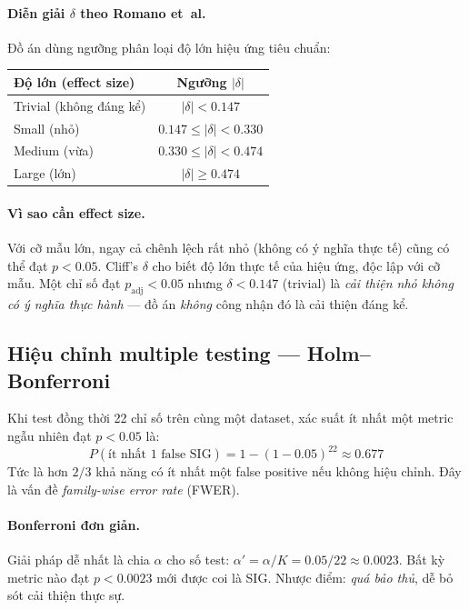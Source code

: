 \paragraph{Diễn giải $\delta$ theo Romano et~al.}
Đồ án dùng ngưỡng phân loại độ lớn hiệu ứng tiêu chuẩn:
\begin{center}
\begin{tabular}{lc}
\toprule
\textbf{Độ lớn (effect size)} & \textbf{Ngưỡng $|\delta|$} \\
\midrule
Trivial (không đáng kể)   & $|\delta| < 0.147$ \\
Small (nhỏ)               & $0.147 \le |\delta| < 0.330$ \\
Medium (vừa)              & $0.330 \le |\delta| < 0.474$ \\
Large (lớn)               & $|\delta| \ge 0.474$ \\
\bottomrule
\end{tabular}
\end{center}

\paragraph{Vì sao cần effect size.}
Với cỡ mẫu lớn, ngay cả chênh lệch rất nhỏ (không có ý nghĩa thực tế) cũng có thể đạt $p < 0.05$. Cliff's $\delta$ cho biết độ lớn thực tế của hiệu ứng, độc lập với cỡ mẫu. Một chỉ số đạt $p_{\mathrm{adj}} < 0.05$ nhưng $\delta < 0.147$ (trivial) là \emph{cải thiện nhỏ không có ý nghĩa thực hành} --- đồ án \emph{không} công nhận đó là cải thiện đáng kể.

\subsection{Hiệu chỉnh multiple testing --- Holm--Bonferroni}
\label{ssec:holm}

Khi test đồng thời 22 chỉ số trên cùng một dataset, xác suất ít nhất một metric ngẫu nhiên đạt $p < 0.05$ là:
\begin{equation}
P(\text{ít nhất 1 false SIG}) = 1 - (1 - 0.05)^{22} \approx 0.677
\end{equation}
Tức là hơn $2/3$ khả năng có ít nhất một false positive nếu không hiệu chỉnh. Đây là vấn đề \emph{family-wise error rate} (FWER).

\paragraph{Bonferroni đơn giản.}
Giải pháp dễ nhất là chia $\alpha$ cho số test: $\alpha' = \alpha / K = 0.05 / 22 \approx 0.0023$. Bất kỳ metric nào đạt $p < 0.0023$ mới được coi là SIG. Nhược điểm: \emph{quá bảo thủ}, dễ bỏ sót cải thiện thực sự.

